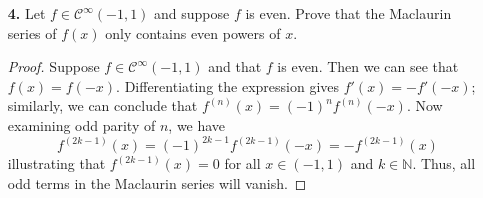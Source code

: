 \documentclass[ 12pt ]{article}
\begin{document}
\begin{enumerate}
	\item[\textbf{4.}] Let $f \in \mathcal{C}^\infty (-1, 1)$ and suppose $f$ is even. Prove that the Maclaurin series of $f(x)$ only contains even powers of $x$.

		\begin{proof}
			Suppose $f \in \mathcal{C}^\infty (-1, 1)$ and that $f$ is even. Then we can see that $f(x) = f(-x)$. Differentiating the expression gives $f'(x) = -f'(-x)$; similarly, we
			can conclude that $f^{(n)}(x) = (-1)^n f^{(n)}(-x)$. Now examining odd parity of $n$, we have $$f^{(2k-1)}(x) = (-1)^{2k-1}f^{(2k-1)}(-x) = -f^{(2k-1)}(x)$$
			illustrating that $f^{(2k-1)}(x) = 0$ for all $x \in (-1, 1)$ and $k \in \mathbb{N}$. Thus, all odd terms in the Maclaurin series will vanish.
		\end{proof}

\end{enumerate}
\end{document}
